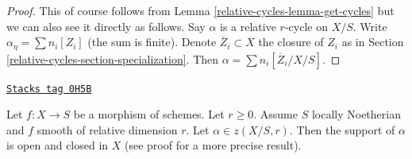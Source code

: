 \begin{proof}
This of course follows from Lemma \ref{relative-cycles-lemma-get-cycles} but we can
also see it directly as follows. Say $\alpha$ is a relative $r$-cycle
on $X/S$. Write $\alpha_\eta = \sum n_i[Z_i]$ (the sum is finite). Denote
$\overline{Z}_i \subset X$ the closure of $Z_i$ as in
Section \ref{relative-cycles-section-specialization}. Then
$\alpha = \sum n_i[\overline{Z}_i/X/S]$.
\end{proof}

\begin{lemma}
\label{relative-cycles-lemma-relative-cycle-smooth}
\href{https://stacks.math.columbia.edu/tag/0H5B}{\texttt{Stacks tag 0H5B}}

Let $f : X \to S$ be a morphism of schemes. Let $r \geq 0$. Assume $S$
locally Noetherian and $f$ smooth of relative dimension $r$. Let
$\alpha \in z(X/S, r)$. Then the support of $\alpha$ is open and closed in $X$
(see proof for a more precise result).
\end{lemma}

